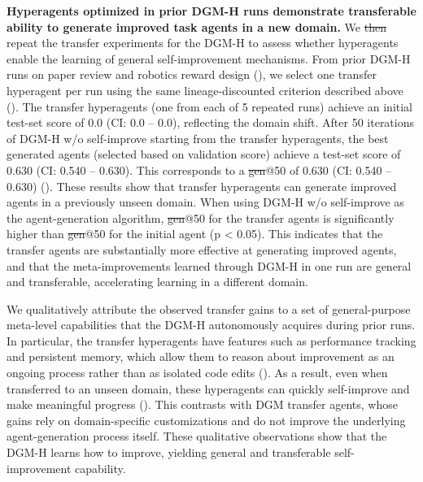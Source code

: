 \documentclass[]{fairmeta}
\providecommand{\DIFaddtex}[1]{{\protect\color{blue}\uwave{#1}}} %
\providecommand{\DIFdeltex}[1]{{\protect\color{red}\sout{#1}}}                      %
\providecommand{\DIFaddbegin}{} %
\providecommand{\DIFaddend}{} %
\providecommand{\DIFdelbegin}{} %
\providecommand{\DIFdelend}{} %
\providecommand{\DIFadd}[1]{\texorpdfstring{\DIFaddtex{#1}}{#1}} %
\providecommand{\DIFdel}[1]{\texorpdfstring{\DIFdeltex{#1}}{}} %
\begin{document}
\textbf{Hyperagents optimized in prior DGM-H runs demonstrate transferable ability to generate improved task agents in a new domain.}
We \DIFdelbegin \DIFdel{then }\DIFdelend repeat the transfer experiments for the DGM-H to assess whether hyperagents enable the learning of general self-improvement mechanisms. From prior DGM-H runs on paper review and robotics reward design (), we select one transfer hyperagent per run using the same lineage-discounted criterion described above (). The transfer hyperagents (one from each of 5 repeated runs) achieve an initial test-set score of 0.0 (CI: 0.0 -- 0.0), reflecting the domain shift. After 50 iterations of DGM-H w/o self-improve starting from the transfer hyperagents, the best generated agents (selected based on validation score) achieve a test-set score of 0.630 (CI: 0.540 -- 0.630). This corresponds to a \DIFdelbegin \DIFdel{gen}\DIFdelend \DIFaddbegin \DIFadd{imp}\DIFaddend @50 of 0.630 (CI: 0.540 -- 0.630) (). These results show that transfer hyperagents can generate improved agents in a previously unseen domain. When using DGM-H w/o self-improve as the agent-generation algorithm, \DIFdelbegin \DIFdel{gen}\DIFdelend \DIFaddbegin \DIFadd{imp}\DIFaddend @50 for the transfer agents is significantly higher than \DIFdelbegin \DIFdel{gen}\DIFdelend \DIFaddbegin \DIFadd{imp}\DIFaddend @50 for the initial agent (p < 0.05). This indicates that the transfer agents are substantially more effective at generating improved agents, and that the meta-improvements learned through DGM-H in one run are general and transferable, accelerating learning in a different domain.

We qualitatively attribute the observed transfer gains to a set of general-purpose meta-level capabilities that the DGM-H autonomously acquires during prior runs. In particular, the transfer hyperagents have features such as performance tracking and persistent memory, which allow them to reason about improvement as an ongoing process rather than as isolated code edits (). As a result, even when transferred to an unseen domain, these hyperagents can quickly self-improve and make meaningful progress (). This contrasts with DGM transfer agents, whose gains rely on domain-specific customizations and do not improve the underlying agent-generation process itself. These qualitative observations show that the DGM-H learns how to improve, yielding general and transferable self-improvement capability.
\end{document}
